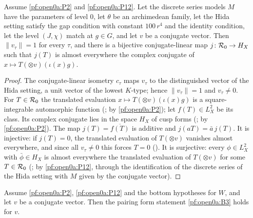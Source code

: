 \begin{lemma}\label{pf:open0a:evalall}
Assume \ref{pf:open0a:P2} and \ref{pf:open0a:P12}. Let the discrete series models $M$ have the parameters of level $0$, let
$\theta$ be an archimedean family, let the Hida setting satisfy the gap condition with constant $100\,r^4$ and the identity
condition, let the level $(J,\chi)$ match at $g\in G$, and let $v$ be a conjugate vector. Then $\|v_\tau\|=1$ for every
$\tau$, and there is a bijective conjugate-linear map $j\colon\mathcal{R}_0\to H_X$ such that $j(T)$ is almost everywhere
the complex conjugate of $x\mapsto T(\otimes v)(\iota(x)g)$.
\end{lemma}

\begin{proof}
The conjugate-linear isometry $c_\tau$ maps $v_\tau$ to the distinguished vector of the Hida setting, a unit vector of the
lowest $K$-type; hence $\|v_\tau\|=1$ and $v_\tau\ne0$. For $T\in\mathcal{R}_0$ the translated evaluation
$x\mapsto T(\otimes v)(\iota(x)g)$ is a square-integrable automorphic function
(; by \ref{pf:open0a:P2}); let $f(T)\in
L^2_X$ be its class. Its complex conjugate lies in the space $H_X$ of cusp forms
(; by \ref{pf:open0a:P2}). The map
$j(T)=\overline{f(T)}$ is additive and $j(aT)=\bar a\,j(T)$. It is injective: if $j(T)=0$, the translated evaluation of
$T(\otimes v)$ vanishes almost everywhere, and since all $v_\tau\ne0$ this forces $T=0$
(). It is surjective: every $\phi\in L^2_X$ with
$\bar\phi\in H_X$ is almost everywhere the translated evaluation of $T(\otimes v)$ for some $T\in\mathcal{R}_0$
(; by \ref{pf:open0a:P12}, through the
identification of the discrete series of the Hida setting with $M$ given by the conjugate vector).
\end{proof}

\begin{proposition}\label{pf:open0a:pairform}
Assume \ref{pf:open0a:P2}, \ref{pf:open0a:P12} and the bottom hypotheses for $W$, and let $v$ be a conjugate vector. Then
the pairing form statement \ref{pf:open0a:B3} holds for $v$.
\end{proposition}

